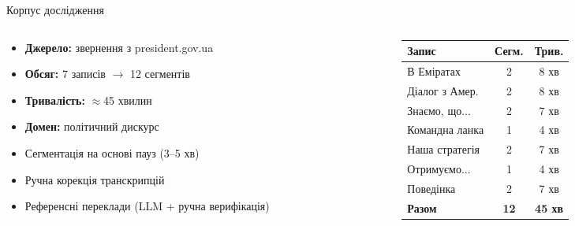 \documentclass[aspectratio=169]{beamer}
\begin{document}
\begin{frame}{Корпус дослідження}
\begin{columns}[T]
\begin{column}{0.55\textwidth}
\begin{itemize}
    \item \textbf{Джерело:} звернення з president.gov.ua
    \item \textbf{Обсяг:} 7 записів $\to$ 12 сегментів
    \item \textbf{Тривалість:} $\approx$45 хвилин
    \item \textbf{Домен:} політичний дискурс
    \item Сегментація на основі пауз (3--5 хв)
    \item Ручна корекція транскрипцій
    \item Референсні переклади (LLM + ручна верифікація)
\end{itemize}
\end{column}
\begin{column}{0.42\textwidth}
\small
\begin{tabular}{lcc}
\toprule
\textbf{Запис} & \textbf{Сегм.} & \textbf{Трив.} \\
\midrule
В Еміратах & 2 & 8 хв \\
Діалог з Амер. & 2 & 8 хв \\
Знаємо, що... & 2 & 7 хв \\
Командна ланка & 1 & 4 хв \\
Наша стратегія & 2 & 7 хв \\
Отримуємо... & 1 & 4 хв \\
Поведінка & 2 & 7 хв \\
\midrule
\textbf{Разом} & \textbf{12} & \textbf{45 хв} \\
\bottomrule
\end{tabular}
\end{column}
\end{columns}
\end{frame}
\end{document}
